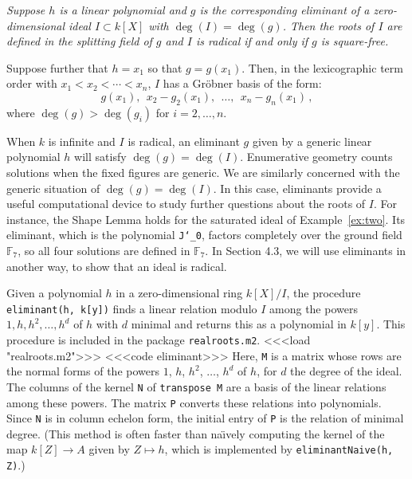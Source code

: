 {\it
Suppose $h$ is a linear polynomial and $g$ is the corresponding eliminant of
a zero-dimensional ideal $I\subset k[X]$ with $\deg(I)=\deg(g)$. 
Then the roots of $I$ are defined in the splitting
field of $g$ and  
$I$ is radical if and only if $g$ is square-free.

Suppose further that $h=x_1$ so that $g=g(x_1)$.
Then, in the lexicographic term order 
with $x_1<x_2<\cdots<x_n$, $I$ has a Gr\"obner basis of
the form: 
%
\begin{equation}\label{triangular}  
    g(x_1),\ \ x_2-g_2(x_1), \ \ \ldots,\ \ x_n-g_n(x_1)\,,
\end{equation}
%
where $\deg(g)>\deg(g_i)$ for $i=2,\ldots,n$.
}\medskip

When $k$ is infinite and $I$ is radical, an eliminant $g$ given by a generic
linear polynomial $h$ will satisfy $\deg(g)=\deg(I)$.
Enumerative geometry counts solutions
when the fixed figures are generic.
We are similarly concerned with the generic situation of 
$\deg(g)=\deg(I)$.
In this case, eliminants provide a useful computational device to study
further questions about the roots of $I$.
For instance, the Shape Lemma holds for the saturated ideal of Example~\ref{ex:two}.
Its eliminant, which is the polynomial {\tt J{\char`\_}0}, factors completely 
over the ground field ${\mathbb F}_7$, so all four solutions are defined
in ${\mathbb F}_7$.
In Section 4.3, we will use eliminants in another way, to show that
an ideal is radical. 

Given a polynomial $h$ in a zero-dimensional ring $k[X]/I$, the
procedure {\tt eliminant(h, k[y])} finds a linear relation modulo $I$ 
among the powers $1, h, h^2, \ldots, h^d$ of $h$ with $d$ minimal
and returns this as a polynomial in $k[y]$.
This procedure is included in the \Mtwo{}\/ package 
{\tt realroots.m2}.
%
<<<load "realroots.m2">>>
%
<<<code eliminant>>>
%
Here, {\tt M} is a matrix whose rows are the normal forms of the
powers  $1$, $h$, $h^2$, $\ldots$, $h^d$ of $h$, for $d$ the degree of the ideal.
The columns of the kernel {\tt N} of {\tt transpose M} are a basis of the
linear relations among these powers. 
The matrix {\tt P} converts these relations into polynomials.
Since {\tt N} is in column echelon form, the initial entry of {\tt P} 
is the relation of minimal degree.
(This method is often faster than na\"\i vely computing the kernel of the
map $k[Z]\to A$ given by $Z\mapsto h$, which is implemented by
{\tt  eliminantNaive(h, Z)}.)

